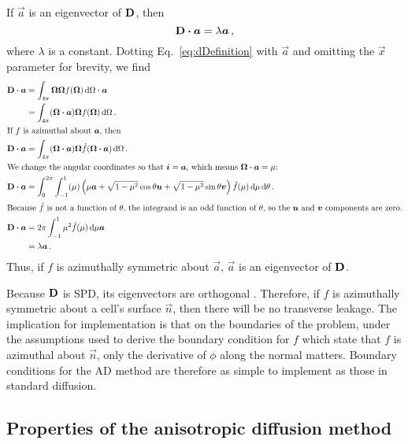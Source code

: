 If $\vec{a}$ is an eigenvector of $\mathbf{D}$, then
\begin{equation*}
  \mathbf{D} \bm{\cdot} \bm{a} = \lambda \bm{a}\,,
\end{equation*}
where $\lambda$ is a constant. Dotting Eq.~\eqref{eq:dDefinition} with
$\vec{a}$ and omitting the $\vec{x}$ parameter for brevity, we find
\begin{align*}
  \mathbf{D} \bm{\cdot} \bm{a}
  &= \int_{4\pi} \bm{\Omega} \bm{\Omega} f(\bm{\Omega}) \mathop{}\!\mathrm{d}\Omega \bm{\cdot} \bm{a}
  \\
  &= \int_{4\pi} (\bm{\Omega} \bm{\cdot} \bm{a}) \bm{\Omega} f(\bm{\Omega}) \mathop{}\!\mathrm{d}\Omega
  \,.
  \\ 
  \intertext{If $f$ is azimuthal about $\bm{a}$, then}
  \mathbf{D} \bm{\cdot} \bm{a}
  &= \int_{4\pi} (\bm{\Omega} \bm{\cdot} \bm{a}) \bm{\Omega}
    \hat f(\bm{\Omega} \bm{\cdot} \bm{a}) \mathop{}\!\mathrm{d}\Omega \,.
  \\ 
  \intertext{We change the angular coordinates so that $\bm{i}=\bm{a}$, which
  means $\bm{\Omega} \bm{\cdot} \bm{a}=\mu$:}
  \mathbf{D} \bm{\cdot} \bm{a}
  &= \int_{0}^{2\pi} \int_{-1}^{1} (\mu)
  \left( \mu \bm{a} + \sqrt{1-\mu^2} \cos \theta \bm{u} + \sqrt{1-\mu^2} \sin
  \theta \bm{v} \right) \hat f(\mu) \mathop{}\!\mathrm{d}\mu \mathop{}\!\mathrm{d}\theta \,.
\\ 
\intertext{Because $\hat f$ is not a function of $\theta$, the integrand is an
odd function of $\theta$, so the $\bm{u}$ and $\bm{v}$ components are zero.}
  \mathbf{D} \bm{\cdot} \bm{a}
  &= 2\pi \int_{-1}^{1} \mu^2 \hat f(\mu) \mathop{}\!\mathrm{d}\mu \bm{a}
  \\
  &= \lambda \bm{a} \,.
\end{align*}
Thus, if $f$ is azimuthally symmetric about $\vec{a}$, $\vec{a}$ is an
eigenvector of $\mathbf{D}$.

Because $\mathbf{D}$ is SPD, its eigenvectors are orthogonal \cite[p.173]{Tre1997}.
Therefore, if $f$ is azimuthally symmetric about a cell's surface $\vec{n}$,
then there will be no transverse leakage. The implication for implementation
is that on the boundaries of the problem, under the assumptions used to derive
the boundary condition for $f$ which state that $f$ is azimuthal about
$\vec{n}$, only the derivative of $\phi$ along the normal matters. Boundary
conditions for the AD method are therefore as simple to implement as those in
standard diffusion.

\subsection{Properties of the anisotropic diffusion method}

